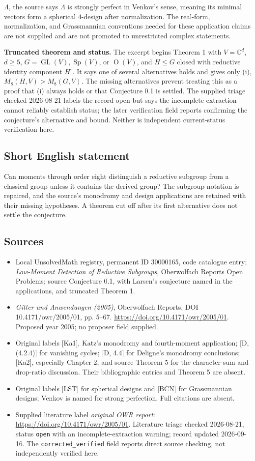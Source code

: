 \documentclass[11pt]{article}
\newcommand{\C}{\mathbb{C}}
\begin{document}
\(\Lambda\), the source says \(\Lambda\) is strongly perfect in Venkov's sense, meaning its minimal vectors form a spherical \(4\)-design after normalization. The real-form, normalization, and Grassmannian conventions needed for these application claims are not supplied and are not promoted to unrestricted complex statements.\par \textbf{Truncated theorem and status.} The excerpt begins Theorem 1 with \(V=\C^d\), \(d\ge5\), \(G=\operatorname{GL}(V),\operatorname{Sp}(V)\), or \(\operatorname{O}(V)\), and \(H\le G\) closed with reductive identity component \(H^\circ\). It says one of several alternatives holds and gives only (i), \(M_8(H,V)>M_8(G,V)\). The missing alternatives prevent treating this as a proof that (i) always holds or that Conjecture 0.1 is settled. The supplied triage checked 2026-08-21 labels the record open but says the incomplete extraction cannot reliably establish status; the later verification field reports confirming the conjecture's alternative and bound. Neither is independent current-status verification here.
\subsection{Short English statement}
Can moments through order eight distinguish a reductive subgroup from a classical group unless it contains the derived group? The subgroup notation is repaired, and the source's monodromy and design applications are retained with their missing hypotheses. A theorem cut off after its first alternative does not settle the conjecture.
\subsection{Sources}
\begin{itemize}\item Local UnsolvedMath registry, permanent ID 30000165, code catalogue entry; \emph{Low-Moment Detection of Reductive Subgroups}, Oberwolfach Reports Open Problems; source Conjecture 0.1, with Larsen's conjecture named in the applications, and truncated Theorem 1.\item \emph{Gitter und Anwendungen (2005)}, Oberwolfach Reports, DOI 10.4171/owr/2005/01, pp. 5--67. \url{https://doi.org/10.4171/owr/2005/01}. Proposed year 2005; no proposer field supplied.\item Original labels [Ka1], Katz's monodromy and fourth-moment application; [D, (4.2.4)] for vanishing cycles; [D, 4.4] for Deligne's monodromy conclusions; [Ka2], especially Chapter 2, and source Theorem 5 for the character-sum and drop-ratio discussion. Their bibliographic entries and Theorem 5 are absent.\item Original labels [LST] for spherical designs and [BCN] for Grassmannian designs; Venkov is named for strong perfection. Full citations are absent.\item Supplied literature label \emph{original OWR report}: \url{https://doi.org/10.4171/owr/2005/01}. Literature triage checked 2026-08-21, status \texttt{open} with an incomplete-extraction warning; record updated 2026-09-16. The \texttt{corrected\_verified} field reports direct source checking, not independently verified here.\end{itemize}
\end{document}
